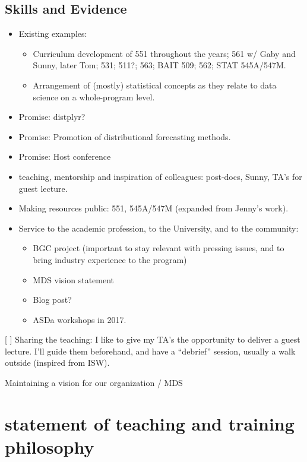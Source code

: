 \documentclass[]{book}
\providecommand{\tightlist}{%
  \setlength{\itemsep}{0pt}\setlength{\parskip}{0pt}}
\begin{document}
\hypertarget{skills-and-evidence}{%
\section{Skills and Evidence}\label{skills-and-evidence}}

\begin{itemize}
\item
  Existing examples:

  \begin{itemize}
  \tightlist
  \item
    Curriculum development of 551 throughout the years; 561 w/ Gaby and Sunny, later Tom; 531; 511?; 563; BAIT 509; 562; STAT 545A/547M.
  \item
    Arrangement of (mostly) statistical concepts as they relate to data science on a whole-program level.
  \end{itemize}
\item
  Promise: distplyr?
\item
  Promise: Promotion of distributional forecasting methods.
\item
  Promise: Host conference
\item
  teaching, mentorship and inspiration of colleagues: post-docs, Sunny, TA's for guest lecture.
\item
  Making resources public: 551, 545A/547M (expanded from Jenny's work).
\item
  Service to the academic profession, to the University, and to the community:

  \begin{itemize}
  \tightlist
  \item
    BGC project (important to stay relevant with pressing issues, and to bring industry experience to the program)
  \item
    MDS vision statement
  \item
    Blog post?
  \item
    ASDa workshops in 2017.
  \end{itemize}
\end{itemize}

{[} {]} Sharing the teaching: I like to give my TA's the opportunity to deliver a guest lecture. I'll guide them beforehand, and have a ``debrief'' session, usually a walk outside (inspired from ISW).

Maintaining a vision for our organization / MDS

\hypertarget{statement-of-teaching-and-training-philosophy}{%
\chapter{statement of teaching and training philosophy}\label{statement-of-teaching-and-training-philosophy}}
\end{document}

